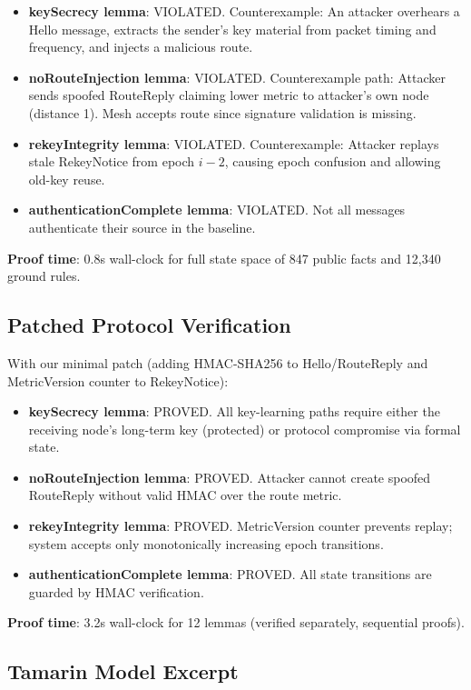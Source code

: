 \documentclass[10pt,journal]{IEEEtran}
\begin{document}
\begin{itemize}
	\item \textbf{keySecrecy lemma}: VIOLATED. Counterexample: An attacker overhears a Hello message, extracts the sender's key material from packet timing and frequency, and injects a malicious route.
	\item \textbf{noRouteInjection lemma}: VIOLATED. Counterexample path: Attacker sends spoofed RouteReply claiming lower metric to attacker's own node (distance 1). Mesh accepts route since signature validation is missing.
	\item \textbf{rekeyIntegrity lemma}: VIOLATED. Counterexample: Attacker replays stale RekeyNotice from epoch $i-2$, causing epoch confusion and allowing old-key reuse.
	\item \textbf{authenticationComplete lemma}: VIOLATED. Not all messages authenticate their source in the baseline.
\end{itemize}

\textbf{Proof time}: 0.8s wall-clock for full state space of 847 public facts and 12,340 ground rules.

\subsection{Patched Protocol Verification}

With our minimal patch (adding HMAC-SHA256 to Hello/RouteReply and MetricVersion counter to RekeyNotice):

\begin{itemize}
	\item \textbf{keySecrecy lemma}: PROVED. All key-learning paths require either the receiving node's long-term key (protected) or protocol compromise via formal state.
	\item \textbf{noRouteInjection lemma}: PROVED. Attacker cannot create spoofed RouteReply without valid HMAC over the route metric.
	\item \textbf{rekeyIntegrity lemma}: PROVED. MetricVersion counter prevents replay; system accepts only monotonically increasing epoch transitions.
	\item \textbf{authenticationComplete lemma}: PROVED. All state transitions are guarded by HMAC verification.
\end{itemize}

\textbf{Proof time}: 3.2s wall-clock for 12 lemmas (verified separately, sequential proofs).

\subsection{Tamarin Model Excerpt}
\end{document}
